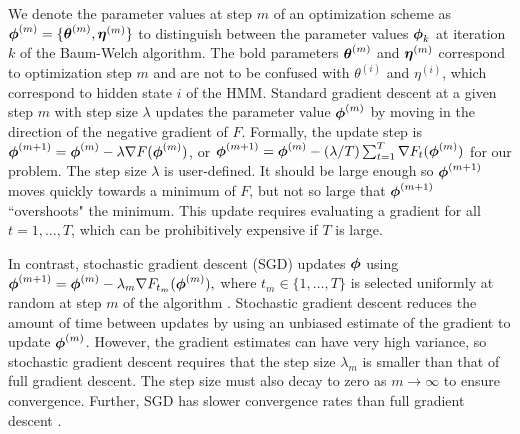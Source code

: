 We denote the parameter values at step $m$ of an optimization scheme as $\boldsymbol{\phi}^{(m)} = \{\boldsymbol{\theta}^{(m)},\boldsymbol{\eta}^{(m)}\}$ to distinguish between the parameter values $\boldsymbol{\phi}_k$ at iteration $k$ of the Baum-Welch algorithm. The bold parameters $\boldsymbol{\theta}^{(m)}$ and $\boldsymbol{\eta}^{(m)}$ correspond to optimization step $m$ and are not to be confused with $\theta^{(i)}$ and $\eta^{(i)}$, which correspond to hidden state $i$ of the HMM. Standard gradient descent at a given step $m$ with step size $\lambda$ updates the parameter value $\boldsymbol{\phi}^{(m)}$ by moving in the direction of the negative gradient of $F$. Formally, the update step is
%
    $\boldsymbol{\phi}^{(m+1)} = \boldsymbol{\phi}^{(m)} - \lambda \nabla F(\boldsymbol{\phi}^{(m)})$, or $\boldsymbol{\phi}^{(m+1)} = \boldsymbol{\phi}^{(m)} - (\lambda/T) \sum_{t=1}^T \nabla F_t(\boldsymbol{\phi}^{(m)})$ for our problem.
%
The step size $\lambda$ is user-defined. It should be large enough so $\boldsymbol{\phi}^{(m+1)}$ moves quickly towards a minimum of $F$, but not so large that $\boldsymbol{\phi}^{(m+1)}$ ``overshoots" the minimum. This update requires evaluating a gradient for all $t = 1,\ldots,T$, which can be prohibitively expensive if $T$ is large.

In contrast, stochastic gradient descent (SGD) updates $\boldsymbol{\phi}$ using
%
$\boldsymbol{\phi}^{(m+1)} = \boldsymbol{\phi}^{(m)} - \lambda_m \nabla F_{t_m}(\boldsymbol{\phi}^{(m)}),$
%
where $t_m \in \{1,\ldots,T\}$ is selected uniformly at random at step $m$ of the algorithm \citep{Robbins:1951}. Stochastic gradient descent reduces the amount of time between updates by using an unbiased estimate of the gradient to update $\boldsymbol{\phi}^{(m)}$. However, the gradient estimates can have very high variance, so stochastic gradient descent requires that the step size $\lambda_m$ is smaller than that of full gradient descent. The step size must also decay to zero as $m \to \infty$ to ensure convergence. Further, SGD has slower convergence rates than full gradient descent \citep{Schmidt:2017}.

